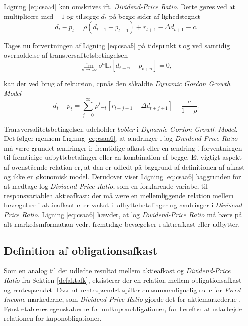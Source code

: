\documentclass[
  a4paper,
  oneside]{memoir}
\begin{document}
Ligning \eqref{eq:csaa4} kan omskrives ift. \emph{Dividend-Price Ratio}. Dette gøres ved at multiplicere med \(-1\) og tillægge \(d_t\) på begge sider af lighedstegnet
\begin{equation}
d_t-p_t=\rho(d_{t+1}-p_{t+1}) + r_{t+1} -\Delta d_{t+1}-c. \label{eq:csaa5}
\end{equation}

Tages nu forventningen af Ligning \eqref{eq:csaa5} på tidspunkt \(t\) og ved samtidig overholdelse af transversalitetsbetingelsen
\[\lim_{n\to\infty } \rho^n\mathbb{E}_t\left[d_{t+n}-p_{t+n}\right]= 0,\]

kan der ved brug af rekursion, opnås den såkaldte \emph{Dynamic Gordon Growth Model}
\begin{equation}
d_t-p_t=\sum_{j=0}^\infty \rho^j \mathbb{E}_t\left[r_{t+j+1}-\Delta d_{t+j+1}\right]-\frac{c}{1-\rho}. \label{eq:csaa6}
\end{equation}

Transversalitetsbetingelsen udeholder \emph{bobler} i \emph{Dynamic Gordon Growth Model}. Det følger igennem Ligning \eqref{eq:csaa6}, at ændringer i log \emph{Dividend-Price Ratio} må være grundet ændringer i: fremtidige afkast eller en ændring i forventningen til fremtidige udbyttebetalinger eller en kombination af begge. Et vigtigt aspekt af ovenstående relation er, at den er udledt på baggrund af definitionen af afkast og ikke en økonomisk model. Derudover viser Ligning \eqref{eq:csaa6} baggrunden for at medtage log \emph{Dividend-Price Ratio}, som en forklarende variabel til responsvariablen aktieafkast: der må være en mellemliggende relation mellem bevægelser i aktieafkast eller vækst i udbyttebetalinger og ændringer i \emph{Dividend-Price Ratio}. Ligning \eqref{eq:csaa6} hævder, at log \emph{Dividend-Price Ratio} må bære på alt markedsinformation vedr. fremtidige bevægelser i aktieafkast eller udbytter.

\hypertarget{defafobl}{%
\subsection{Definition af obligationsafkast}\label{defafobl}}

Som en analog til det udledte resultat mellem aktieafkast og \emph{Dividend-Price Ratio} fra Sektion \ref{defaktafk}, eksisterer der en relation mellem obligationsafkast og rentespændet. Dvs. at rentespændet spiller en sammenlignelig rolle for \emph{Fixed Income} markederne, som \emph{Dividend-Price Ratio} gjorde det for aktiemarkederne \citep{Campbell1997}. Først etableres egenskaberne for nulkuponobligationer, for herefter at udarbejde relationen for kuponobligationer.
\end{document}
